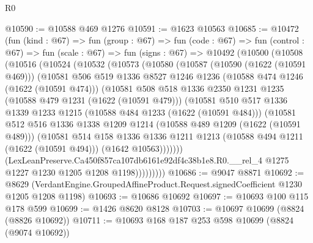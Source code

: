 \begin{lexlean}{R0}
\begin{coremodule}
@10590 := @10588 @469 @1276
@10591 := @1623 @10563
@10685 := @10472
    (fun (kind : @67) =>
    fun (group : @67) =>
    fun (code : @67) =>
    fun (control : @67) =>
    fun (scale : @67) =>
    fun (signs : @67) =>
    @10492
      (@10500
        (@10508
          (@10516
            (@10524
              (@10532
                (@10573
                  (@10580
                    (@10587
                      (@10590 (@1622 (@10591 @469)))
                      (@10581
                        @506
                        @519
                        @1336
                        @8527
                        @1246
                        @1236
                        (@10588 @474 @1246 (@1622 (@10591 @474)))
                        (@10581
                          @508
                          @518
                          @1336
                          @2350
                          @1231
                          @1235
                          (@10588 @479 @1231 (@1622 (@10591 @479)))
                          (@10581
                            @510
                            @517
                            @1336
                            @1339
                            @1233
                            @1215
                            (@10588 @484 @1233 (@1622 (@10591 @484)))
                            (@10581
                              @512
                              @516
                              @1336
                              @1338
                              @1209
                              @1214
                              (@10588 @489 @1209 (@1622 (@10591 @489)))
                              (@10581
                                @514
                                @158
                                @1336
                                @1336
                                @1211
                                @1213
                                (@10588 @494 @1211 (@1622 (@10591 @494)))
                                (@1642 @10563)))))))
                    (LexLeanPreserve.Ca450f857ca107db6161e92df4c38b1e8.R0.__rel_4
                      @1275
                      @1227
                      @1230
                      @1205
                      @1208
                      @1198)))))))))
@10686 := @9047 @8871
@10692 := @8629
    (VerdantEngine.GroupedAffineProduct.Request.signedCoefficient @1230 @1205 @1208 @1198)
@10693 := @10686 @10692
@10697 := @10693 @100 @115 @178 @599
@10699 := @1426 @8620 @8128
@10703 := @10697 @10699 (@8824 (@8826 @10692))
@10711 := @10693 @168 @187 @253 @598 @10699 (@8824 (@9074 @10692))

\end{coremodule}
\end{lexlean}
